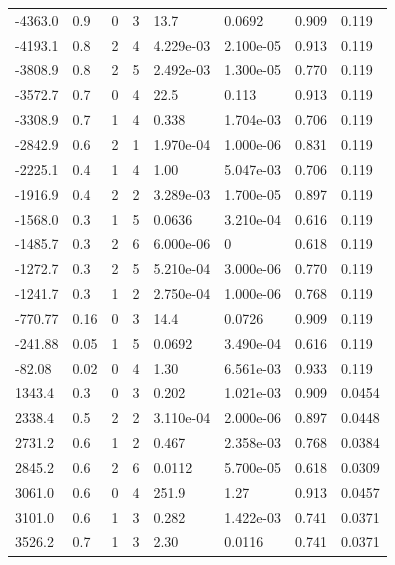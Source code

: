 \documentclass[preview]{standalone}
\begin{document}
{{\begin{tabular}{L{1.2cm}C{1.2cm} C{0.3cm}C{0.5cm} C{1.4cm}C{1.4cm} C{1.4cm}C{1.4cm}}
  -4363.0  &   0.9  & 0     &  3 &  13.7  & 0.0692  & 0.909 &  0.119   \\ 
  -4193.1  &   0.8  & 2     &  4 &  4.229e-03  & 2.100e-05  & 0.913 &  0.119   \\ 
  -3808.9  &   0.8  & 2     &  5 &  2.492e-03  & 1.300e-05  & 0.770 &  0.119   \\ 
  -3572.7  &   0.7  & 0     &  4 &  22.5  & 0.113  & 0.913 &  0.119   \\ 
  -3308.9  &   0.7  & 1     &  4 &  0.338  & 1.704e-03  & 0.706 &  0.119   \\ 
  -2842.9  &   0.6  & 2     &  1 &  1.970e-04  & 1.000e-06  & 0.831 &  0.119   \\ 
  -2225.1  &   0.4  & 1     &  4 &  1.00  & 5.047e-03  & 0.706 &  0.119   \\ 
  -1916.9  &   0.4  & 2     &  2 &  3.289e-03  & 1.700e-05  & 0.897 &  0.119   \\ 
  -1568.0  &   0.3  & 1     &  5 &  0.0636  & 3.210e-04  & 0.616 &  0.119   \\ 
  -1485.7  &   0.3  & 2     &  6 &  6.000e-06  & 0  & 0.618 &  0.119   \\ 
  -1272.7  &   0.3  & 2     &  5 &  5.210e-04  & 3.000e-06  & 0.770 &  0.119   \\ 
  -1241.7  &   0.3  & 1     &  2 &  2.750e-04  & 1.000e-06  & 0.768 &  0.119   \\ 
  -770.77  &  0.16  & 0     &  3 &  14.4  & 0.0726  & 0.909 &  0.119   \\ 
  -241.88  &  0.05  & 1     &  5 &  0.0692  & 3.490e-04  & 0.616 &  0.119   \\ 
  -82.08  &  0.02  & 0     &  4 &  1.30  & 6.561e-03  & 0.933 &  0.119   \\ 
  1343.4  &   0.3  & 0     &  3 &  0.202  & 1.021e-03  & 0.909 &  0.0454   \\ 
  2338.4  &   0.5  & 2     &  2 &  3.110e-04  & 2.000e-06  & 0.897 &  0.0448   \\ 
  2731.2  &   0.6  & 1     &  2 &  0.467  & 2.358e-03  & 0.768 &  0.0384   \\ 
  2845.2  &   0.6  & 2     &  6 &  0.0112  & 5.700e-05  & 0.618 &  0.0309   \\ 
  3061.0  &   0.6  & 0     &  4 &  251.9  & 1.27  & 0.913 &  0.0457   \\ 
  3101.0  &   0.6  & 1     &  3 &  0.282  & 1.422e-03  & 0.741 &  0.0371   \\ 
  3526.2  &   0.7  & 1     &  3 &  2.30  & 0.0116  & 0.741 &  0.0371   \\ 

\end{tabular}}}
\end{document}
